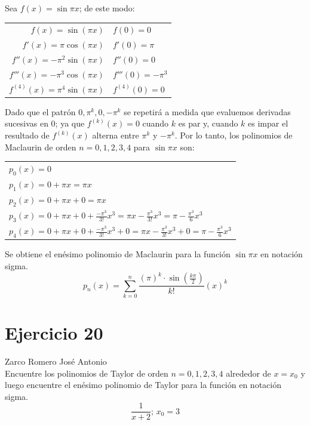\documentclass[12pt]{article}
\begin{document}
Sea $f(x)=\sin \pi x$; de este modo:
\begin{center}
  \begin{tabular}{r l}
    $f(x)=\sin (\pi x)$ & $f(0)=0$ \\
    $f'(x)=\pi \cos (\pi x)$ & $f'(0)=\pi$ \\
    $f''(x)= - \pi ^2 \sin (\pi x)$ & $f''(0)=0$ \\
    $f'''(x)= - \pi ^3 \cos (\pi x)$ & $f'''(0)=-\pi ^3$ \\
    $f^{(4)}(x)= \pi ^4 \sin (\pi x)$ & $f^{(4)}(0)=0$ \\
  \end{tabular}
\end{center}
Dado que el patrón $0, \pi ^k, 0, -\pi ^k$ se repetirá a medida que evaluemos derivadas sucesivas en 0; ya que $f^{(k)}(x)=0$ cuando $k$ es par y, cuando $k$ es impar el resultado de $f^{(k)}(x)$ alterna entre $\pi ^k$ y $-\pi ^k$.
Por lo tanto, los polinomios de Maclaurin de orden $n = 0, 1, 2, 3, 4$ para $\sin \pi x$ son:
\begin{center}
  \begin{tabular}{l}
    $p_0(x)=0$ \\
    $p_1(x)=0+\pi x=\pi x$ \\
    $p_2(x)=0+\pi x+0=\pi x$ \\
    $p_3(x)=0+\pi x+0+\frac{-\pi ^3}{3!}x^3=\pi x- \frac{\pi ^3}{3!}x^3=\pi - \frac{\pi ^3}{6}x^3$ \\
    $p_4(x)=0+\pi x+0+\frac{-\pi ^3}{3!}x^3+0=\pi x - \frac{\pi ^3}{3!}x^3+0=\pi - \frac{\pi ^3}{6}x^3$ \\
  \end{tabular}
\end{center}
Se obtiene el enésimo polinomio de Maclaurin para la función $\sin \pi x$ en notación sigma.
\[
p_n(x)=\sum_{k=0}^{n} \frac{(\pi)^k \cdot \sin(\frac{k \pi }{2})}{k!}(x)^k
\]

\section{Ejercicio 20} Zarco Romero José Antonio \\

Encuentre los polinomios de Taylor de orden $n = 0, 1, 2, 3, 4$ alrededor de $x = x_0$ y luego encuentre el enésimo polinomio de Taylor para la función en notación sigma.
\[\frac{1}{x+2}\text{; }x_0=3\]
\end{document}
